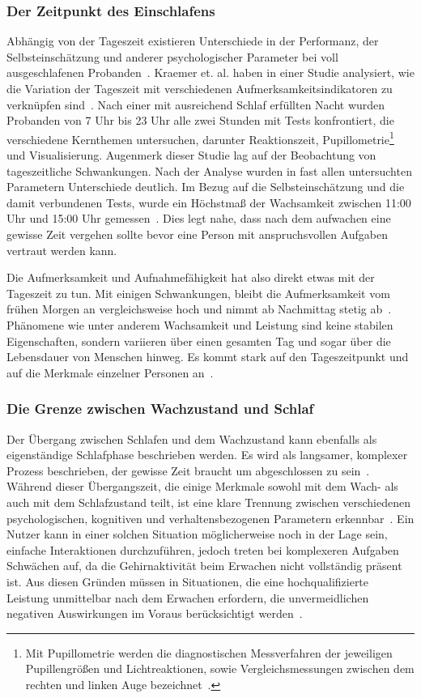 \subsubsection{Der Zeitpunkt des Einschlafens}

Abhängig von der Tageszeit existieren Unterschiede in der Performanz, der Selbsteinschätzung und anderer psychologischer Parameter bei voll ausgeschlafenen Probanden~\cite{kraemer2000time}.
Kraemer et. al. haben in einer Studie analysiert, wie die Variation der Tageszeit mit verschiedenen Aufmerksamkeitsindikatoren zu verknüpfen sind~\cite{kraemer2000time}. 
Nach einer mit ausreichend Schlaf erfüllten Nacht wurden Probanden von 7 Uhr bis 23 Uhr alle zwei Stunden mit Tests konfrontiert, die verschiedene Kernthemen untersuchen, darunter Reaktionszeit, Pupillometrie\footnote{Mit Pupillometrie werden die diagnostischen Messverfahren der jeweiligen Pupillengrößen und Lichtreaktionen, sowie Vergleichsmessungen zwischen dem rechten und linken Auge bezeichnet~\cite{sachsenweger1975neuroophthalmologie}.} und Visualisierung.
Augenmerk dieser Studie lag auf der Beobachtung von tageszeitliche Schwankungen. Nach der Analyse wurden in fast allen untersuchten Parametern Unterschiede deutlich. 
Im Bezug auf die Selbsteinschätzung und die damit verbundenen Tests, wurde ein Höchstmaß der Wachsamkeit zwischen 11:00 Uhr und 15:00 Uhr gemessen~\cite{kraemer2000time}. Dies legt nahe, dass nach dem aufwachen eine gewisse Zeit vergehen sollte bevor eine Person mit anspruchsvollen Aufgaben vertraut werden kann.

Die Aufmerksamkeit und Aufnahmefähigkeit hat also direkt etwas mit der Tageszeit zu tun.
Mit einigen Schwankungen, bleibt die Aufmerksamkeit vom frühen Morgen an vergleichsweise hoch und nimmt ab Nachmittag stetig ab~\cite{kraemer2000time}.
Phänomene wie unter anderem Wachsamkeit und Leistung sind keine stabilen Eigenschaften, sondern variieren über einen gesamten Tag und sogar über die Lebensdauer von Menschen hinweg. 
Es kommt stark auf den Tageszeitpunkt und auf die Merkmale einzelner Personen an~\cite{kraemer2000time}.

\subsubsection{Die Grenze zwischen Wach­zu­stand und Schlaf}

Der Übergang zwischen Schlafen und dem Wachzustand kann ebenfalls als eigenständige Schlafphase beschrieben werden. Es wird als langsamer, komplexer Prozess beschrieben, der gewisse Zeit braucht um abgeschlossen zu sein~\cite{ferrara2000sleep}. 
Während dieser Übergangszeit, die einige Merkmale sowohl mit dem Wach- als auch mit dem Schlafzustand teilt, ist eine klare Trennung zwischen verschiedenen psychologischen, kognitiven und verhaltensbezogenen Parametern erkennbar~\cite{ferrara2000sleep}. 
Ein Nutzer kann in einer solchen Situation möglicherweise noch in der Lage sein, einfache Interaktionen durchzuführen, jedoch treten bei komplexeren Aufgaben Schwächen auf, da die Gehirnaktivität beim Erwachen nicht vollständig präsent ist. 
Aus diesen Gründen müssen in Situationen, die eine hochqualifizierte Leistung unmittelbar nach dem Erwachen erfordern, die unvermeidlichen negativen Auswirkungen im Voraus berücksichtigt werden~\cite{ferrara2000sleep}.

